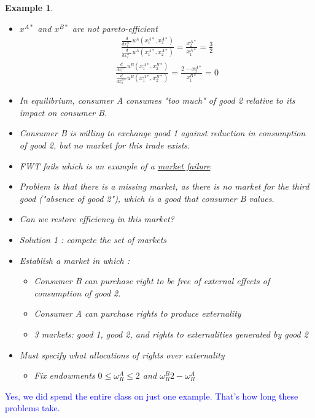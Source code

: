 \documentclass[twoside]{article}
\newtheorem{ex}[theorem]{Example}
\begin{document}
\begin{ex}
\begin{itemize}
\begin{itemize}
\item Prices \(p^* = (1 , \frac{2}{3})\) and allocations 
\(x^{A*} = \left(\frac{4}{3}, 2\right)\), \(x^{B*} = \left(\frac{5}{3}, 0\right)\) form a competitive equilibrium 
\end{itemize}
\item \(x^{A*}\) and \(x^{B*}\) are not pareto-efficient
\[\begin{aligned} 
\frac{\frac{d}{dx_1^{A*}} u^A(x_1^{A*}, x_2^{A*})}{\frac{d}{dx_2^{A*}} u^A(x_1^{A*}, x_2^{A*})} = \frac{x_2^{A*}}{x_1^{A*}} = \frac{3}{2}
\end{aligned}\]
\[\begin{aligned} 
\frac{\frac{d}{dx_1^{B*}} u^B(x_1^{A*}, x_2^{B*})}{\frac{d}{dx_2^{B*}} u^B(x_1^{A*}, x_2^{B*})} = \frac{2-x_2^{A*}}{x_1^{B*}} = 0
\end{aligned}\]
\item In equilibrium, consumer A consumes "too much" of good 2 relative to its impact on consumer B.
\item Consumer B is willing to exchange good 1 against reduction in consumption of good 2, but no market for this trade exists.  
\item FWT fails which is an example of a \underline{market failure}
\item Problem is that there is a missing market, as there is no market for the third good ("absence of good 2"), which is a good that consumer B values.
\item Can we restore efficiency in this market?
\item Solution 1 : compete the set of markets
\item Establish a market in which : 
\begin{itemize}
\item Consumer B can purchase right to be free of external effects of consumption of good 2.
\item Consumer A can purchase rights to produce externality
\item 3 markets: good 1, good 2, and rights to externalities generated by good 2 
\end{itemize}
\item Must specify what allocations of rights over externality 
\begin{itemize}
\item Fix endowments \(0 \leq \omega_R^A \leq 2 \) and \(\omega_R^B 2 - \omega^A_R\)
\end{itemize} 
\end{itemize}
\end{ex}
\begin{center}
\textcolor{blue}{Yes, we did spend the entire class on just one example. That's how long these problems take.}  \Sadey[1.3][red]
\end{center}
\end{document}
